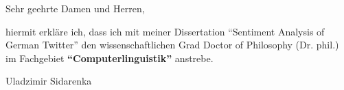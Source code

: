 \documentclass[12pt]{dinbrief}
\newcommand{\wowa}{Uladzimir Sidarenka}
\newcommand{\sgdh}{Sehr geehrte Damen und Herren}
\begin{document}
\begin{letter}
  \addresshigh
  \nowindowrules %
  \nobackaddressrule %

  \date{\today}
  \subject{\textbf{Erkl\"arung \"uber das Fachgebiet der angestrebten Promotion}}
  \opening{\sgdh,}

  hiermit erkl\"are ich, dass ich mit meiner Dissertation ``Sentiment
  Analysis of German Twitter'' den wissenschaftlichen Grad Doctor of
  Philosophy (Dr. phil.) im Fachgebiet \textbf{``Computerlinguistik''}
  anstrebe.

  \bigskip
  \hfill\wowa
\end{letter}
\end{document}

